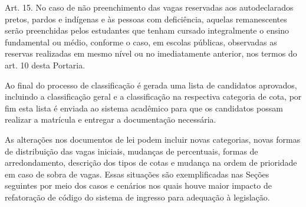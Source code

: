 \begin{citacao}
Art. 15. No caso de não preenchimento das vagas reservadas aos autodeclarados pretos, pardos
e indígenas e às pessoas com deficiência, aquelas remanescentes serão preenchidas pelos
estudantes que tenham cursado integralmente o ensino fundamental ou médio, conforme o caso,
em escolas públicas, observadas as reservas realizadas em mesmo nível ou no imediatamente
anterior, nos termos do art. 10 desta Portaria. \cite{portarianr9}
\end{citacao}

Ao final do processo de classificação é gerada uma lista de candidatos aprovados, incluindo a classificação geral e a classificação na respectiva categoria de cota, por fim esta lista é enviada ao sistema acadêmico para que os candidatos possam realizar a matrícula e entregar a documentação necessária. 

As alterações nos documentos de lei podem incluir novas categorias, novas formas de distribuição das vagas iniciais, mudanças de percentuais, formas de arredondamento, descrição dos tipos de cotas e mudança na ordem de prioridade em caso de sobra de vagas. Essas situações são exemplificadas nas Seções seguintes por meio dos casos e cenários nos quais houve maior impacto de refatoração de código do sistema de ingresso para adequação à legislação.









